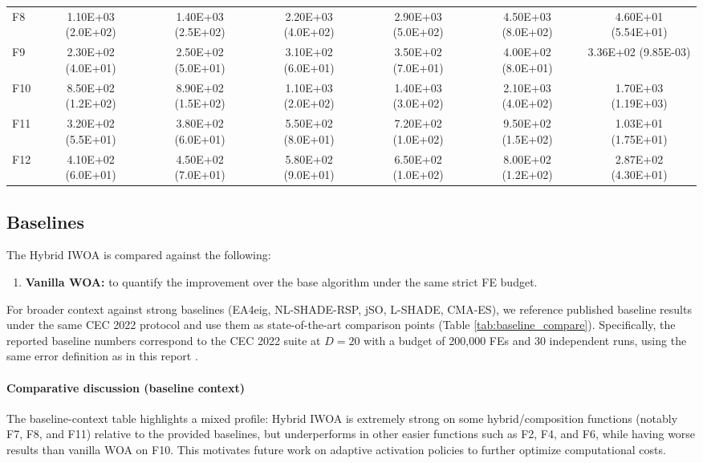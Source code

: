 \documentclass[conference]{IEEEtran}
\begin{document}
\begin{table}[!t]
{\begin{tabular}{lcccccc}
F8  & 1.10E+03 (2.0E+02) & 1.40E+03 (2.5E+02) & 2.20E+03 (4.0E+02) & 2.90E+03 (5.0E+02) & 4.50E+03 (8.0E+02) & 4.60E+01 (5.54E+01) \\
F9  & 2.30E+02 (4.0E+01) & 2.50E+02 (5.0E+01) & 3.10E+02 (6.0E+01) & 3.50E+02 (7.0E+01) & 4.00E+02 (8.0E+01) & 3.36E+02 (9.85E-03) \\
F10 & 8.50E+02 (1.2E+02) & 8.90E+02 (1.5E+02) & 1.10E+03 (2.0E+02) & 1.40E+03 (3.0E+02) & 2.10E+03 (4.0E+02) & 1.70E+03 (1.19E+03) \\
F11 & 3.20E+02 (5.5E+01) & 3.80E+02 (6.0E+01) & 5.50E+02 (8.0E+01) & 7.20E+02 (1.0E+02) & 9.50E+02 (1.5E+02) & 1.03E+01 (1.75E+01) \\
F12 & 4.10E+02 (6.0E+01) & 4.50E+02 (7.0E+01) & 5.80E+02 (9.0E+01) & 6.50E+02 (1.0E+02) & 8.00E+02 (1.2E+02) & 2.87E+02 (4.30E+01) \\
\bottomrule
\end{tabular}%
}
\end{table}

\subsection{Baselines}
The Hybrid IWOA is compared against the following:
\begin{enumerate}
    \item \textbf{Vanilla WOA:} to quantify the improvement over the base algorithm under the same strict FE budget.
\end{enumerate}
For broader context against strong baselines (EA4eig, NL-SHADE-RSP, jSO, L-SHADE, CMA-ES), we reference published baseline results under the same CEC 2022 protocol \cite{Biedrzycki2022,BiedrzyckiAnalysis,Stanovov2022,Comparative2022} and use them as state-of-the-art comparison points (Table \ref{tab:baseline_compare}).
Specifically, the reported baseline numbers correspond to the CEC 2022 suite at $D=20$ with a budget of 200{,}000 FEs and 30 independent runs, using the same error definition as in this report \cite{Suganthan2022,Biedrzycki2022,BiedrzyckiAnalysis,Stanovov2022,Comparative2022}.

\paragraph{Comparative discussion (baseline context)}
The baseline-context table highlights a mixed profile: Hybrid IWOA is extremely strong on some hybrid/composition functions (notably F7, F8, and F11) relative to the provided baselines, but underperforms in other easier functions such as F2, F4, and F6, while having worse results than vanilla WOA on F10. This motivates future work on adaptive activation policies to further optimize computational costs.
\end{document}
